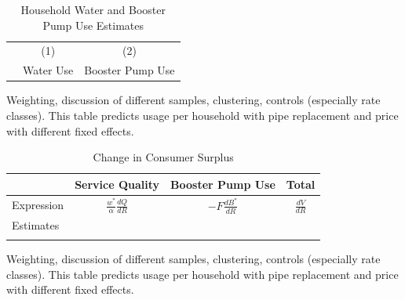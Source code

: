 \documentclass[12pt,table]{article}
\begin{document}


\begin{table}[h!] 
\centering
\caption{Household Water and Booster Pump Use Estimates}\label{table:mainregs}
\vspace{-2mm} 
\begin{threeparttable}
\begin{tabular}{@{}l*{1}{CC}@{}}
\toprule
  & (1)       & (2)              \\
  & Water Use & Booster Pump Use \\
\midrule

\bottomrule
\end{tabular}
\begin{tablenotes}
\footnotesize
\item Weighting, discussion of different samples, clustering, controls (especially rate classes).  This table predicts usage per household with pipe replacement and price with different fixed effects.  
\end{tablenotes}
\end{threeparttable}
\end{table}




\begin{table}[h!] 
\centering
\caption{Change in Consumer Surplus}\label{table:mainregs}
\vspace{-2mm}
\begin{threeparttable}
\begin{tabular}{@{}l*{1}{CCC}@{}}
\toprule
            & Service Quality              & Booster Pump Use & Total             \\
\midrule
Expression  & $\frac{w^{*}}{\alpha} \frac{dQ}{dR}$ &   $- F \frac{dB^{*}}{dR}$  & $\frac{dV}{dR}$ \\[1em]
Estimates   &   \\
            &    \\
\bottomrule
\end{tabular}
\begin{tablenotes}
\footnotesize
\item Weighting, discussion of different samples, clustering, controls (especially rate classes).  This table predicts usage per household with pipe replacement and price with different fixed effects.  
\end{tablenotes}
\end{threeparttable}
\end{table}
\end{document}
